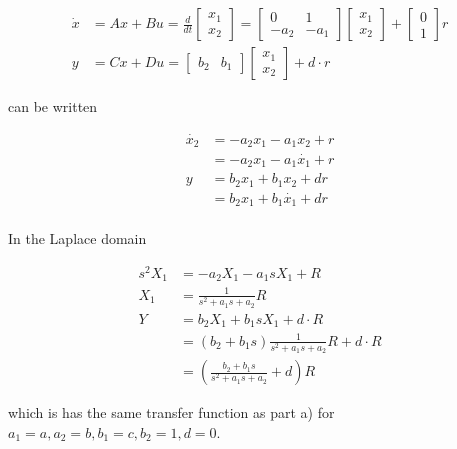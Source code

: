 \documentclass[11pt]{article}
\theoremstyle{definition}
\begin{document}
\begin{enumerate}
\begin{enumerate}
        \begin{align*}
            \dot{x} &= Ax + Bu = \frac{d}{dt} \begin{bmatrix} x_1 \\ x_2 \end{bmatrix} = \begin{bmatrix} 0 & 1 \\ -a_2 & -a_1 \end{bmatrix} \begin{bmatrix} x_1 \\ x_2 \end{bmatrix} + \begin{bmatrix} 0 \\ 1 \end{bmatrix} r \\
            y &= Cx + Du = \begin{bmatrix} b_2 & b_1 \end{bmatrix} \begin{bmatrix} x_1 \\ x_2 \end{bmatrix} + d \cdot r
        \end{align*}

        can be written 

        \begin{align*}
            \dot{x_2} &= -a_2 x_1 - a_1 x_2 + r \\
            &= -a_2 x_1 - a_1 \dot{x_1} + r \\
            y &= b_2 x_1 +  b_1 x_2 + dr \\
            &= b_2 x_1  + b_1 \dot{x_1} + dr \\
        \end{align*}

        In the Laplace domain

        \begin{align*}
            s^2 X_1 &= -a_2 X_1 - a_1 s X_1 + R \\
            X_1 &= \frac{1}{s^2 + a_1 s + a_2} R \\
            Y &= b_2 X_1 + b_1sX_1 + d \cdot R \\
            &= (b_2 + b_1s) \frac{1}{s^2 + a_1 s + a_2} R + d \cdot R \\
            &= \left( \frac{b_2 + b_1 s}{s^2 + a_1s + a_2} + d \right) R
        \end{align*}

        which is has the same transfer function as part a) for $a_1 = a, a_2 =b, b_1 = c, b_2 = 1, d = 0$.


\end{enumerate}
\end{enumerate}
\end{document}
